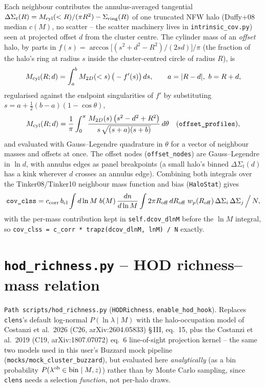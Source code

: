 \documentclass[a4paper, 11pt]{article}
\newcommand{\lob}{\lambda^{\rm ob}}
\newcommand{\modname}[1]{\textcolor{kwcol}{\texttt{#1}}}
\newcommand{\pyfile}[1]{{\small\texttt{#1}}}
\begin{document}
Each neighbour contributes the annulus-averaged tangential
$\Delta\Sigma_t(R) = M_{\rm cyl}(<R)/(\pi R^2) - \Sigma_{\rm ring}(R)$
of one truncated NFW halo (Duffy+08 median $c(M)$, no scatter -- the
scatter machinery lives in \texttt{intrinsic\_cov.py}) seen at
projected offset $d$ from the cluster centre. The cylinder mass of an
\emph{offset} halo, by parts in $f(s)=\arccos\!\big[(s^2+d^2-R^2)/
(2sd)\big]/\pi$ (the fraction of the halo's ring at radius $s$ inside
the cluster-centred circle of radius $R$), is
\begin{equation}
  M_{\rm cyl}(R;d) = \int_a^b M_{2D}(<s)\,\big(-f'(s)\big)\,ds,
  \qquad a=|R-d|,\ b=R+d,
\end{equation}
regularised against the endpoint singularities of $f'$ by substituting
$s = a + \tfrac12(b-a)(1-\cos\theta)$,
\begin{equation}
  M_{\rm cyl}(R;d) = \frac{1}{\pi}\int_0^\pi
    \frac{M_{2D}(s)\,\big(s^2-d^2+R^2\big)}{s\,\sqrt{(s+a)(s+b)}}\,d\theta
  \quad(\texttt{offset\_profiles}),
\end{equation}
and evaluated with Gauss--Legendre quadrature in $\theta$ for a vector
of neighbour masses and offsets at once. The offset nodes
(\texttt{offset\_nodes}) are Gauss--Legendre in $\ln d$, with annulus
edges as panel breakpoints (a small halo's binned $\Delta\Sigma_t(d)$
has a kink wherever $d$ crosses an annulus edge). Combining both
integrals over the Tinker08/Tinker10 neighbour mass function and bias
(\texttt{HaloStat}) gives
\begin{equation}
  \texttt{cov\_clss} = c_{\rm corr}\,b_{\rm cl}
    \int d\ln M\; b(M)\,\frac{dn}{d\ln M}
    \int 2\pi R_{\rm off}\,dR_{\rm off}\; w_p(R_{\rm off})\,
    \Delta\Sigma_i\,\Delta\Sigma_j \,\Big/\, N,
\end{equation}
with the per-mass contribution kept in \texttt{self.dcov\_dlnM} before
the $\ln M$ integral, so \texttt{cov\_clss =
c\_corr * trapz(dcov\_dlnM, lnM) / N} exactly.

\section{\pyfile{hod\_richness.py} -- HOD richness--mass relation}
\label{sec:hod}

\modname{Path}\ \pyfile{scripts/hod\_richness.py}
(\texttt{HODRichness}, \texttt{enable\_hod\_hook}). Replaces
\modname{clens}'s default log-normal $P(\ln\lambda\mid M)$ with the
halo-occupation model of Costanzi et al.\ 2026 (C26, arXiv:2604.05833)
\S\,III, eq.~15, plus the Costanzi et al.\ 2019 (C19, arXiv:1807.07072)
eq.~6 line-of-sight projection kernel -- the same two models used in
this user's Buzzard mock pipeline
(\pyfile{mocks/mock\_cluster\_buzzard}), but evaluated here
\emph{analytically} (as a bin probability $P(\lob\in{\rm bin}\mid
M,z)$) rather than by Monte Carlo sampling, since \modname{clens}
needs a selection \emph{function}, not per-halo draws.
\end{document}
